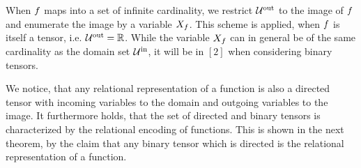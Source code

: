 \begin{remark}
	When $f$ maps into a set of infinite cardinality, we restrict $\mathcal{U}^{\mathrm{out}}$ to the image of $f$ and enumerate the image by a variable $X_{f}$.
	This scheme is applied, when $f$ is itself a tensor, i.e. $\mathcal{U}^{\mathrm{out}}=\mathbb{R}$.
	While the variable $X_{f}$ can in general be of the same cardinality as the domain set $\mathcal{U}^{\mathrm{in}}$, it will be in $[2]$ when considering binary tensors.
\end{remark}

We notice, that any relational representation of a function is also a directed tensor with incoming variables to the domain and outgoing variables to the image.
It furthermore holds, that the set of directed and binary tensors is characterized by the relational encoding of functions.
This is shown in the next theorem, by the claim that any binary tensor which is directed is the relational representation of a function.

